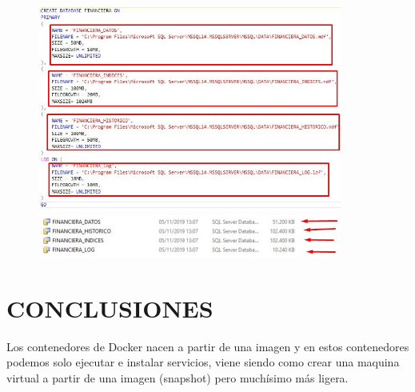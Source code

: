 \documentclass[preprint,12pt]{elsarticle}
\begin{document}
\begin{enumerate}[a)]
\begin{figure}[htb]
\begin{center}
		\includegraphics[width=10cm]{./IMAGENES/Docker14}
		\includegraphics[width=10cm]{./IMAGENES/Docker15}
	\end{center}
\end{figure}
\end{enumerate}



\section{CONCLUSIONES}
Los contenedores de Docker nacen a partir de una imagen y en estos contenedores podemos solo ejecutar e instalar servicios, viene siendo como crear una maquina virtual a partir de una imagen (snapshot) pero muchísimo más ligera. 
\end{document}
